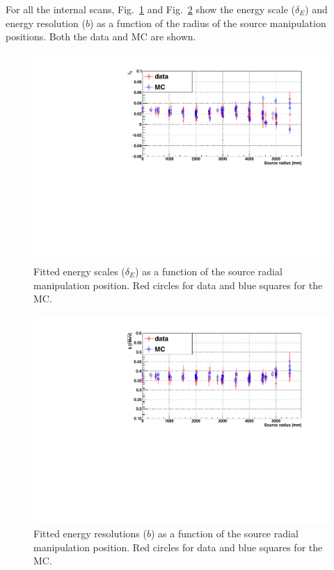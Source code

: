 For all the internal scans, Fig.~\ref{fig:EscaleVsR} and Fig.~\ref{fig:EresolVsR} show the energy scale ($\delta_E$) and energy resolution ($b$) as a function of the radius of the source manipulation positions. Both the data and MC are shown.
\begin{figure}
	\centering
    \includegraphics[width=12cm]{EscaleVsSrcRadius.pdf}
	\caption[Fitted energy scales ($\delta_E$) as a function of the source radial manipulation position.]{Fitted energy scales ($\delta_E$) as a function of the source radial manipulation position. Red circles for data and blue squares for the MC.}
	\label{fig:EscaleVsR}
\end{figure}

\begin{figure}
	\centering
	\includegraphics[width=12cm]{EresolVsSrcRadius.pdf}
	\caption[Fitted energy resolutions ($b$) as a function of the source radial manipulation position.]{Fitted energy resolutions ($b$) as a function of the source radial manipulation position. Red circles for data and blue squares for the MC.}
	\label{fig:EresolVsR}
\end{figure}

